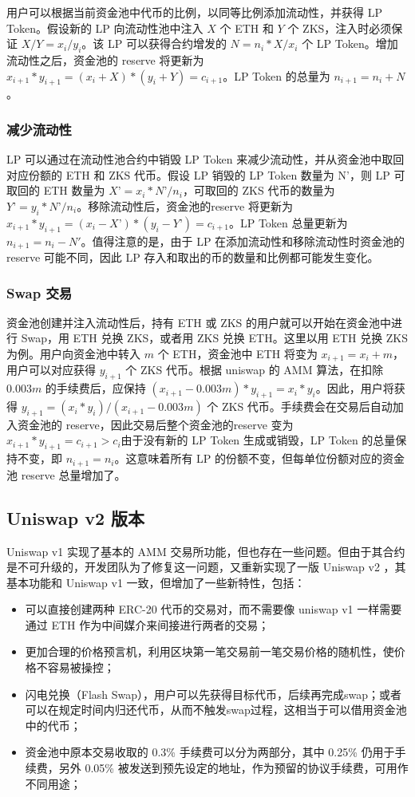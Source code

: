 \documentclass[]{template/llncs}
\begin{document}
用户可以根据当前资金池中代币的比例，以同等比例添加流动性，并获得 LP Token。假设新的 LP 向流动性池中注入 $X$ 个 ETH 和 $Y$ 个 ZKS，注入时必须保证 $X/Y = x_i/y_i$。该 LP 可以获得合约增发的 $N = n_i*X/x_i$ 个 LP Token。增加流动性之后，资金池的 reserve 将更新为 $x_{i+1}*y_{i+1} =  (x_i+X)*(y_i+Y) = c_{i+1}$。LP Token 的总量为 $n_{i+1} = n_i + N$。

\subsubsection{减少流动性}

 LP 可以通过在流动性池合约中销毁 LP Token 来减少流动性，并从资金池中取回对应份额的 ETH 和 ZKS 代币。假设 LP 销毁的 LP Token 数量为 N’，则 LP 可取回的 ETH 数量为 $X’ = x_i*N’/n_i$，可取回的 ZKS 代币的数量为 $Y’ = y_i*N’/n_i$。移除流动性后，资金池的reserve 将更新为 $x_{i+1}*y_{i+1} = (x_i - X’)*(y_i - Y’) = c_{i+1}$。LP Token 总量更新为 $n_{i+1} = n_i - N'$。值得注意的是，由于 LP 在添加流动性和移除流动性时资金池的 reserve 可能不同，因此 LP 存入和取出的币的数量和比例都可能发生变化。

\subsubsection{Swap 交易}

资金池创建并注入流动性后，持有 ETH 或 ZKS 的用户就可以开始在资金池中进行 Swap，用 ETH 兑换 ZKS，或者用 ZKS 兑换 ETH。这里以用 ETH 兑换 ZKS 为例。用户向资金池中转入 $m$ 个 ETH，资金池中 ETH 将变为 $x_{i+1} = x_i + m，$用户可以对应获得 $y_{i+1}$ 个 ZKS 代币。根据 uniswap 的 AMM 算法，在扣除 $0.003m$ 的手续费后，应保持 $(x_{i+1} - 0.003m)*y_{i+1} = x_i*y_i$。因此，用户将获得 $y_{i+1} = (x_i*y_i)/(x_{i+1} - 0.003m)$ 个 ZKS 代币。手续费会在交易后自动加入资金池的 reserve，因此交易后整个资金池的reserve 变为 $x_{i+1}*y_{i+1} = c_{i+1} > c_i$由于没有新的 LP Token 生成或销毁，LP Token 的总量保持不变，即 $n_{i+1} = n_i$。这意味着所有 LP 的份额不变，但每单位份额对应的资金池 reserve 总量增加了。


\subsection{Uniswap v2 版本}
Uniswap v1 实现了基本的 AMM 交易所功能，但也存在一些问题。但由于其合约是不可升级的，开发团队为了修复这一问题，又重新实现了一版 Uniswap v2 \cite{uniswapv2}，其基本功能和 Uniswap v1 一致，但增加了一些新特性，包括：

\begin{itemize}
	\item 可以直接创建两种 ERC-20 代币的交易对，而不需要像 uniswap v1 一样需要通过 ETH 作为中间媒介来间接进行两者的交易；
	\item 更加合理的价格预言机，利用区块第一笔交易前一笔交易价格的随机性，使价格不容易被操控；
	\item 闪电兑换（Flash Swap），用户可以先获得目标代币，后续再完成swap；或者可以在规定时间内归还代币，从而不触发swap过程，这相当于可以借用资金池中的代币；
	\item 资金池中原本交易收取的 0.3\% 手续费可以分为两部分，其中 0.25\% 仍用于手续费，另外 0.05\% 被发送到预先设定的地址，作为预留的协议手续费，可用作不同用途；
\end{itemize}
\end{document}
